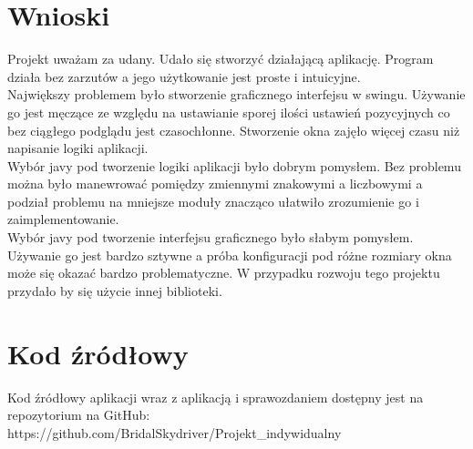 \documentclass[11pt,a4paper]{article}
\begin{document}
\section{Wnioski}
Projekt uważam za udany. Udało się stworzyć działającą aplikację. Program działa bez zarzutów a jego użytkowanie jest proste i intuicyjne.\\
Największy problemem było stworzenie graficznego interfejsu w swingu. Używanie go jest męczące ze względu na ustawianie sporej ilości ustawień pozycyjnych co bez ciągłego podglądu jest czasochłonne. Stworzenie okna zajęło więcej czasu niż napisanie logiki aplikacji.\\
Wybór javy pod tworzenie logiki aplikacji było dobrym pomysłem. Bez problemu można było manewrować pomiędzy zmiennymi znakowymi a liczbowymi a podział problemu na mniejsze moduły znacząco ułatwiło zrozumienie go i zaimplementowanie.\\
Wybór javy pod tworzenie interfejsu graficznego było słabym pomysłem. Używanie go jest bardzo sztywne a próba konfiguracji pod różne rozmiary okna może się okazać bardzo problematyczne. W przypadku rozwoju tego projektu przydało by się użycie innej biblioteki.\\

\section{Kod źródłowy}
Kod źródłowy aplikacji wraz z aplikacją i sprawozdaniem dostępny jest na repozytorium na GitHub:\\
https://github.com/BridalSkydriver/Projekt\_indywidualny
\end{document}
